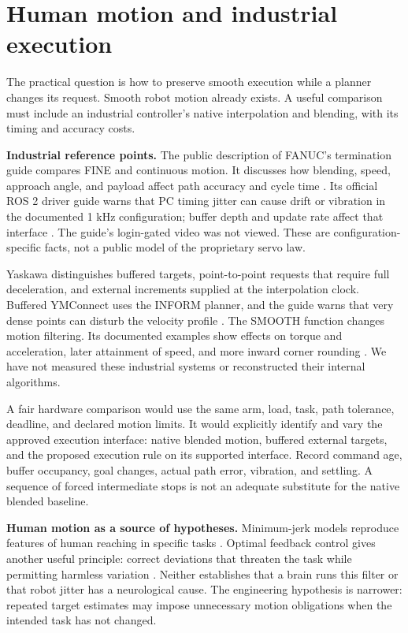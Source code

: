 \section{Human motion and industrial execution}
The practical question is how to preserve smooth execution while a planner changes its request. Smooth robot motion already exists. A useful comparison must include an industrial controller's native interpolation and blending, with its timing and accuracy costs.

\textbf{Industrial reference points.} The public description of FANUC's termination guide compares FINE and continuous motion. It discusses how blending, speed, approach angle, and payload affect path accuracy and cycle time \cite{fanucterm}. Its official ROS 2 driver guide warns that PC timing jitter can cause drift or vibration in the documented 1 kHz configuration; buffer depth and update rate affect that interface \cite{fanuctiming}. The guide's login-gated video was not viewed. These are configuration-specific facts, not a public model of the proprietary servo law.

Yaskawa distinguishes buffered targets, point-to-point requests that require full deceleration, and external increments supplied at the interpolation clock. Buffered YMConnect uses the INFORM planner, and the guide warns that very dense points can disturb the velocity profile \cite{yaskawaapi}. The SMOOTH function changes motion filtering. Its documented examples show effects on torque and acceleration, later attainment of speed, and more inward corner rounding \cite{yaskawasmooth}. We have not measured these industrial systems or reconstructed their internal algorithms.

A fair hardware comparison would use the same arm, load, task, path tolerance, deadline, and declared motion limits. It would explicitly identify and vary the approved execution interface: native blended motion, buffered external targets, and the proposed execution rule on its supported interface. Record command age, buffer occupancy, goal changes, actual path error, vibration, and settling. A sequence of forced intermediate stops is not an adequate substitute for the native blended baseline.

\textbf{Human motion as a source of hypotheses.} Minimum-jerk models reproduce features of human reaching in specific tasks \cite{flashhogan}. Optimal feedback control gives another useful principle: correct deviations that threaten the task while permitting harmless variation \cite{todorov}. Neither establishes that a brain runs this filter or that robot jitter has a neurological cause. The engineering hypothesis is narrower: repeated target estimates may impose unnecessary motion obligations when the intended task has not changed.

